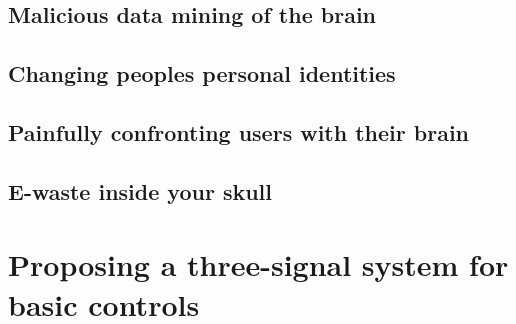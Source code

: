 
\subsection{Malicious data mining of the brain}
\label{subsec:bci_ethical_data_mining}

\lipsum[1-2]


\subsection{Changing peoples personal identities}
\label{subsec:bci_ethical_identity}

\lipsum[1-3]


\subsection{Painfully confronting users with their brain}
\label{subsec:bci_ethical_confronting}

\lipsum[1-4]


\subsection{E-waste inside your skull}
\label{subsec:bci_ethical_e_waste}


\lipsum[1-4]


\section{Proposing a three-signal system for basic controls}
\label{sec:bci_small_projects_ours}

\lipsum[1-3]